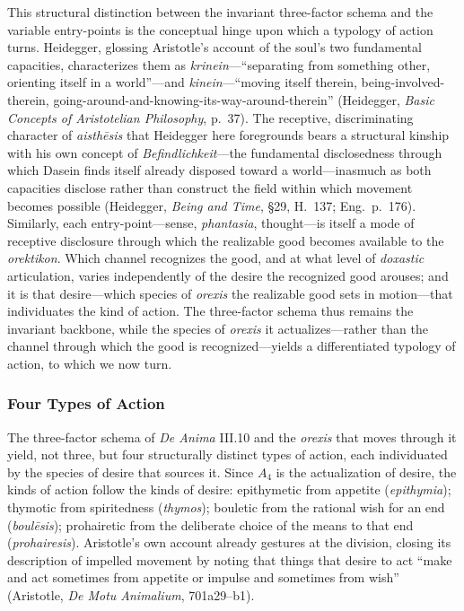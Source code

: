 This structural distinction between the invariant three-factor schema and the variable entry-points is the conceptual hinge upon which a typology of action turns. Heidegger, glossing Aristotle's account of the soul's two fundamental capacities, characterizes them as \textit{krinein}---``separating from something other, orienting itself in a world''---and \textit{kinein}---``moving itself therein, being-involved-therein, going-around-and-knowing-its-way-around-therein'' (Heidegger, \textit{Basic Concepts of Aristotelian Philosophy}, p.~37). The receptive, discriminating character of \textit{aisthēsis} that Heidegger here foregrounds bears a structural kinship with his own concept of \textit{Befindlichkeit}---the fundamental disclosedness through which Dasein finds itself already disposed toward a world---inasmuch as both capacities disclose rather than construct the field within which movement becomes possible (Heidegger, \textit{Being and Time}, \S29, H.~137; Eng.~p.~176). Similarly, each entry-point---sense, \textit{phantasia}, thought---is itself a mode of receptive disclosure through which the realizable good becomes available to the \textit{orektikon}. Which channel recognizes the good, and at what level of \textit{doxastic} articulation, varies independently of the desire the recognized good arouses; and it is that desire---which species of \textit{orexis} the realizable good sets in motion---that individuates the kind of action. The three-factor schema thus remains the invariant backbone, while the species of \textit{orexis} it actualizes---rather than the channel through which the good is recognized---yields a differentiated typology of action, to which we now turn.


\subsubsection*{Four Types of Action}

The three-factor schema of \textit{De Anima} III.10 and the \textit{orexis} that moves through it yield, not three, but four structurally distinct types of action, each individuated by the species of desire that sources it. Since $A_4$ is the actualization of desire, the kinds of action follow the kinds of desire: epithymetic from appetite (\textit{epithymia}); thymotic from spiritedness (\textit{thymos}); bouletic from the rational wish for an end (\textit{boulēsis}); prohairetic from the deliberate choice of the means to that end (\textit{prohairesis}). Aristotle's own account already gestures at the division, closing its description of impelled movement by noting that things that desire to act ``make and act sometimes from appetite or impulse and sometimes from wish'' (Aristotle, \textit{De Motu Animalium}, 701a29--b1).

